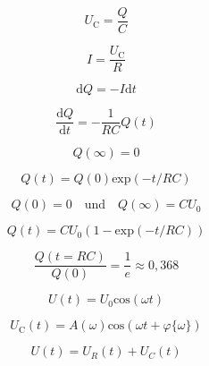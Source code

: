     

        \begin{equation}
            U_{\text{C}} = \frac{Q}{C}
        \end{equation}

        \begin{equation}
            I = \frac{U_{\text{C}}}{R}
        \end{equation}

        \begin{equation}
            \text{d}Q = -I \text{d}t
        \end{equation}

        \begin{equation}
            \frac{\text{d}Q}{\text{d}t} = - \frac{1}{RC} Q(t)
        \end{equation}

        \begin{equation}
            Q(\infty) = 0
        \end{equation}

        \begin{equation}
            Q(t) = Q(0) \text{exp}(-t/RC)
        \end{equation}

        \begin{equation}
            Q(0) = 0 \quad \text{und} \quad Q(\infty) = CU_0 
        \end{equation}

        \begin{equation}
            Q(t) = CU_0(1- \text{exp}(-t/RC))
        \end{equation}

        \begin{equation}
            \frac{Q(t = RC)}{Q(0)} = \frac{1}{e} \approx 0,368
        \end{equation}

        \begin{equation}
            U(t) = U_0 \text{cos}( \omega t)
        \end{equation}

        \begin{equation}
            U_{\text{C}}(t) = A(\omega) \text{cos}(\omega t + \varphi \{ \omega \} )
        \end{equation}

        \begin{equation}
            U(t) = U_R(t) + U_C(t)
        \end{equation}

